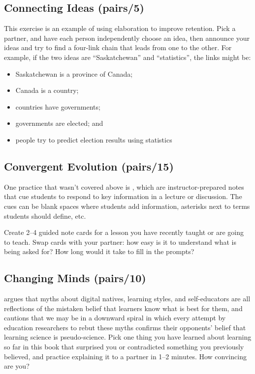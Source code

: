 \subsection*{Connecting Ideas (pairs/5)}

This exercise is an example of using elaboration to improve
retention. Pick a partner, and have each person independently choose an
idea, then announce your ideas and try to find a four-link chain that
leads from one to the other. For example, if the two ideas are
``Saskatchewan'' and ``statistics'', the links might be:

\begin{itemize}
\item
  Saskatchewan is a province of Canada;
\item
  Canada is a country;
\item
  countries have governments;
\item
  governments are elected; and
\item
  people try to predict election results using statistics
\end{itemize}

\subsection*{Convergent Evolution (pairs/15)}

One practice that wasn't covered above is , which are instructor-prepared notes that cue
students to respond to key information in a lecture or discussion. The
cues can be blank spaces where students add information, asterisks
next to terms students should define, etc.

Create 2--4 guided note cards for a lesson you have recently taught or
are going to teach. Swap cards with your partner: how easy is it to
understand what is being asked for? How long would it take to fill in
the prompts?

\subsection*{Changing Minds (pairs/10)}

\cite{Kirs2013} argues that myths about digital natives, learning
styles, and self-educators are all reflections of the mistaken belief
that learners know what is best for them, and cautions that we may be in
a downward spiral in which every attempt by education researchers to
rebut these myths confirms their opponents' belief that learning science
is pseudo-science. Pick one thing you have learned about learning so far
in this book that surprised you or contradicted something you previously
believed, and practice explaining it to a partner in 1--2 minutes. How
convincing are you?


